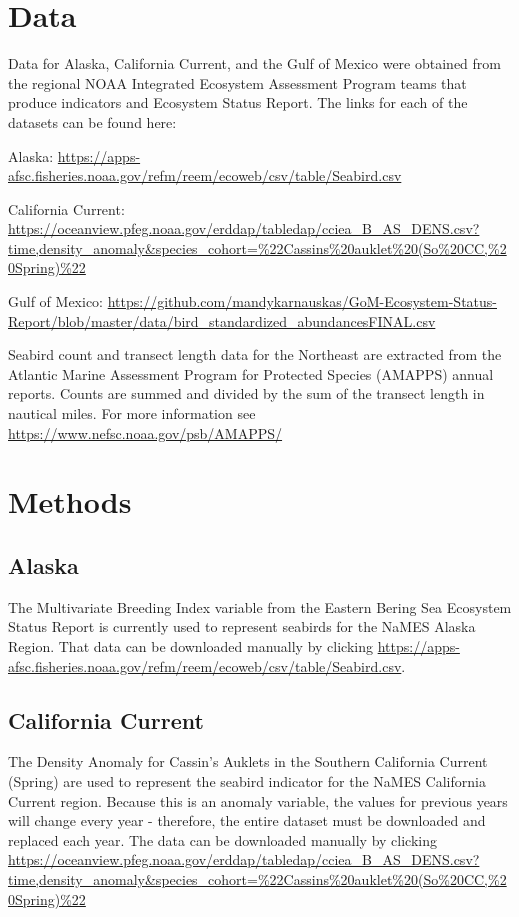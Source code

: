 \documentclass[
]{book}
\begin{document}
\hypertarget{data-3}{%
\section{Data}\label{data-3}}

Data for Alaska, California Current, and the Gulf of Mexico were obtained from the regional NOAA Integrated Ecosystem Assessment Program teams that produce indicators and Ecosystem Status Report. The links for each of the datasets can be found here:

Alaska: \url{https://apps-afsc.fisheries.noaa.gov/refm/reem/ecoweb/csv/table/Seabird.csv}

California Current: \url{https://oceanview.pfeg.noaa.gov/erddap/tabledap/cciea_B_AS_DENS.csv?time,density_anomaly\&species_cohort=\%22Cassins\%20auklet\%20(So\%20CC,\%20Spring)\%22}

Gulf of Mexico: \url{https://github.com/mandykarnauskas/GoM-Ecosystem-Status-Report/blob/master/data/bird_standardized_abundancesFINAL.csv}

Seabird count and transect length data for the Northeast are extracted from the Atlantic Marine Assessment Program for Protected Species (AMAPPS) annual reports. Counts are summed and divided by the sum of the transect length in nautical miles. For more information see \url{https://www.nefsc.noaa.gov/psb/AMAPPS/}

\hypertarget{methods-3}{%
\section{Methods}\label{methods-3}}

\hypertarget{alaska-2}{%
\subsection{Alaska}\label{alaska-2}}

The Multivariate Breeding Index variable from the Eastern Bering Sea Ecosystem Status Report is currently used to represent seabirds for the NaMES Alaska Region. That data can be downloaded manually by clicking \url{https://apps-afsc.fisheries.noaa.gov/refm/reem/ecoweb/csv/table/Seabird.csv}.

\hypertarget{california-current-2}{%
\subsection{California Current}\label{california-current-2}}

The Density Anomaly for Cassin's Auklets in the Southern California Current (Spring) are used to represent the seabird indicator for the NaMES California Current region. Because this is an anomaly variable, the values for previous years will change every year - therefore, the entire dataset must be downloaded and replaced each year. The data can be downloaded manually by clicking \url{https://oceanview.pfeg.noaa.gov/erddap/tabledap/cciea_B_AS_DENS.csv?time,density_anomaly\&species_cohort=\%22Cassins\%20auklet\%20(So\%20CC,\%20Spring)\%22}
\end{document}

